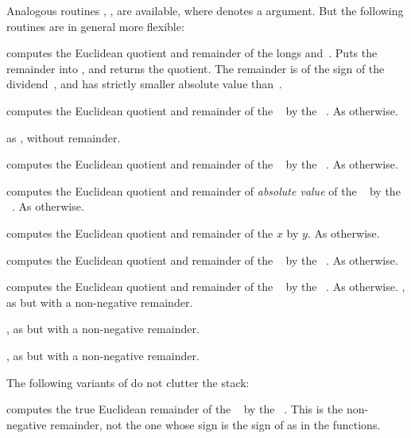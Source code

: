\noindent Analogous routines \kbd{[z]}, \kbd{[z]},
\kbd{[z]} are available, where  denotes a 
argument. But the following routines are in general more flexible:

 computes the Euclidean
quotient and remainder of the longs  and~. Puts the remainder
into , and returns the quotient. The remainder is of the sign of the
dividend~, and has strictly smaller absolute value than~.

 computes the Euclidean
quotient and remainder of the ~ by the ~. As
 otherwise.

 as , without
remainder.

 computes the Euclidean quotient
and remainder of the ~ by the ~. As
 otherwise.

 computes the Euclidean quotient
and remainder of \emph{absolute value} of the ~ by the
~. As  otherwise.

computes the Euclidean quotient and remainder of the $x$ by $y$. As
 otherwise.

 computes the Euclidean quotient
and remainder of the ~ by the ~. As
 otherwise.

 computes the Euclidean quotient
and remainder of the ~ by the ~. As
 otherwise.
\smallskip
{}, as  but with a
non-negative remainder.

, as  but with a
non-negative remainder.

, as  but with a
non-negative remainder.

 The following variants of  do not
clutter the stack:

 computes the true Euclidean
remainder of the ~ by the ~. This is the
non-negative remainder, not the one whose sign is the sign of 
as in the  functions.

